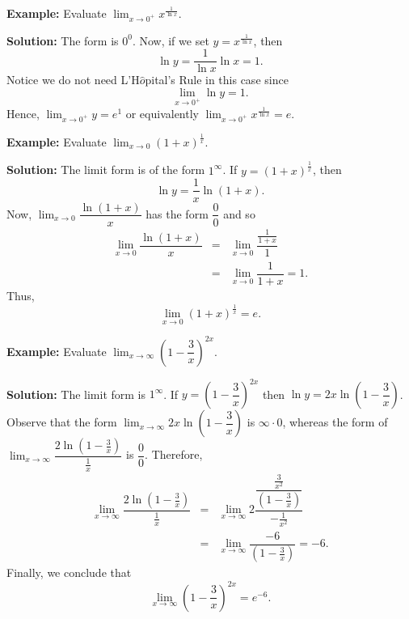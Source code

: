 \documentclass[titlepage,a4paper,12pt]{report}
\begin{document}
\noindent \textbf{Example:} Evaluate $\displaystyle \lim _{x\rightarrow 0^+} x^{\frac{1}{\ln x}}$.

\noindent \textbf{Solution:} The form is $0^0$. Now, if we set $y=x^{\frac{1}{\ln x}}$, then 
\begin{equation*}
\ln y= \dfrac{1}{\ln x} \ln x =1.
\end{equation*}
Notice we do not need L'H$\hat{o}$pital's Rule in this case since 
\begin{equation*}
\lim _{x\rightarrow 0^+} \ln y =1.
\end{equation*}
Hence, $\displaystyle \lim _{x\rightarrow 0^+}y =e^1$ or equivalently $\displaystyle \lim _{x\rightarrow 0^+}x^{\frac{1}{\ln x}}=e$.

\noindent \textbf{Example:} Evaluate $\displaystyle \lim _{x\rightarrow 0} (1+x)^{\frac{1}{x}}$.

\noindent \textbf{Solution:} The limit form is of the form $1^\infty$. If $y=(1+x)^{\frac{1}{x}}$, then 
\begin{equation*}
\ln y =\frac{1}{x}\ln (1+x).
\end{equation*}
Now, $\displaystyle \lim _{x\rightarrow 0} \dfrac{\ln (1+x)}{x}$ has the form $\dfrac{0}{0}$ and so 
\begin{eqnarray*}
\lim _{x\rightarrow 0}\dfrac{\ln (1+x)}{x} &=& \lim _{x\rightarrow 0} \dfrac{\frac{1}{1+x}}{1}\\
&=& \lim _{x\rightarrow 0}  \dfrac{1}{1+x} =1.
\end{eqnarray*}
Thus, 
\begin{equation*}
\lim _{x\rightarrow 0} (1+x)^{\frac{1}{x}} =e.
\end{equation*}

\noindent \textbf{Example:} Evaluate $\displaystyle \lim _{x\rightarrow \infty} \left(1-\dfrac{3}{x}\right)^{2x}$.

\noindent \textbf{Solution:} The limit form is $1^\infty$. If $y=\left(1-\dfrac{3}{x}\right)^{2x}$ then $\ln y =2x \ln \left(1-\dfrac{3}{x}\right)$. Observe that the form $\displaystyle \lim _{x\rightarrow \infty}2x \ln \left(1-\dfrac{3}{x}\right)$ is $\infty \cdot 0$, whereas the form of $\displaystyle \lim _{x\rightarrow \infty} \dfrac{2\ln (1-\frac{3}{x})}{\frac{1}{x}}$ is $\dfrac{0}{0}$. Therefore, 
\begin{eqnarray*}
\lim _{x\rightarrow \infty} \dfrac{2\ln (1-\frac{3}{x})}{\frac{1}{x}} &=& \lim _{x\rightarrow \infty} 2\dfrac{\dfrac{\frac{3}{x^2}}{(1-\frac{3}{x})}}{-\frac{1}{x^2}} \\
&=& \lim _{x\rightarrow \infty} \dfrac{-6}{(1-\frac{3}{x})} =-6.
\end{eqnarray*}
Finally, we conclude that 
\begin{equation*}
\lim _{x\rightarrow \infty} \left( 1-\dfrac{3}{x}\right)^{2x}=e^{-6}.
\end{equation*}
\end{document}
